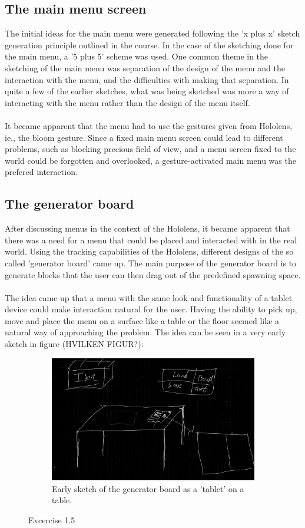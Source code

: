 \subsection{The main menu screen}
The initial ideas for the main menu were generated following the 'x plus x' sketch generation principle outlined in the course. In the case of the sketching done for the main menu, a '5 plus 5' scheme was used. One common theme in the sketching of the main menu was separation of the design of the menu and the interaction with the menu, and the difficulties with making that separation. In quite a few of the earlier sketches, what was being sketched was more a way of interacting with the menu rather than the design of the menu itself.\\
\\
It became apparent that the menu had to use the gestures given from Hololens, ie., the bloom gesture. Since a fixed main menu screen could lead to different problems, such as blocking precious field of view, and a menu screen fixed to the world could be forgotten and overlooked, a gesture-activated main menu was the prefered interaction.

\subsection{The generator board}
After discussing menus in the context of the Hololens, it became apparent that there was a need for a menu that could be placed and interacted with in the real world. Using the tracking capabilities of the Hololens, different designs of the so called 'generator board' came up. The main purpose of the generator board is to generate blocks that the user can then drag out of the predefined spawning space.\\
\\
The idea came up that a menu with the same look and functionality of a tablet device could make interaction natural for the user. Having the ability to pick up, move and place the menu on a surface like a table or the floor seemed like a natural way of approaching the problem. The idea can be seen in a very early sketch in figure (HVILKEN FIGUR?):\\

\begin{figure}[H]
    \centering
    \begin{subfigure}[b]{0.5\textwidth}
        \includegraphics[width=\textwidth]{figures/Generator/gen6.png}
        \caption{Early sketch of the generator board as a 'tablet' on a table.}
    \end{subfigure}
    \caption{Excercise 1.5}
\end{figure}
